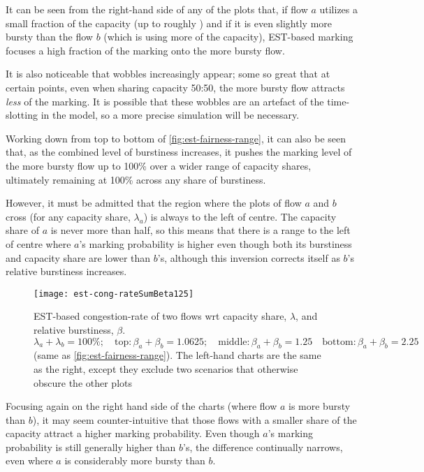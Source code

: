 It can be seen from the right-hand side of any of the plots that, if flow \(a\) utilizes a small fraction of the capacity (up to roughly ) and if it is even slightly more bursty than the flow \(b\) (which is using more of the capacity), EST-based marking focuses a high fraction of the marking onto the more bursty flow. 

It is also noticeable that wobbles increasingly appear; some so great that at certain points, even when sharing capacity 50:50, the more bursty flow attracts \emph{less} of the marking. It is possible that these wobbles are an artefact of the time-slotting in the model, so a more precise simulation will be necessary.

Working down from top to bottom of \autoref{fig:est-fairness-range}, it can also be seen that, as the combined level of burstiness increases, it pushes the marking level of the more bursty flow up to 100\% over a wider range of capacity shares, ultimately remaining at 100\% across any share of burstiness.

However, it must be admitted that the region where the plots of flow \(a\) and \(b\) cross (for any capacity share, \(\lambda_a\)) is always to the left of centre. The capacity share of \(a\) is never more than half, so this means that there is a range to the left of centre where \(a\)'s marking probability is higher even though both its burstiness and capacity share are lower than \(b\)'s, although this inversion corrects itself as \(b\)'s relative burstiness increases.

\begin{figure*}[t!]
	\centering
	\texttt{[image: est-cong-rateSumBeta125]}
	\caption{EST-based congestion-rate of two flows wrt capacity share, \(\lambda\), and relative burstiness, \(\beta\).\\
		\(\lambda_a+\lambda_b=100\%; \quad\mathrm{top:} \beta_a+\beta_b=1.0625; \quad\mathrm{middle:} \beta_a+\beta_b=1.25 
		\quad\mathrm{bottom:} \beta_a+\beta_b=2.25\) (same as \autoref{fig:est-fairness-range}). 
		The left-hand charts are the same as the right, except they exclude two scenarios that otherwise obscure the other plots}\label{fig:cong-rate-range}
\end{figure*}

Focusing again on the right hand side of the charts (where flow \(a\) is more bursty than \(b\)), it may seem counter-intuitive that those flows with a smaller share of the capacity attract a higher marking probability. Even though \(a\)'s marking probability is still generally higher than \(b\)'s, the difference continually narrows, even where \(a\) is considerably more bursty than \(b\).

